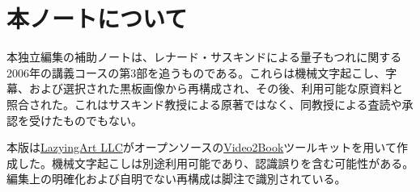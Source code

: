 \documentclass[11pt,oneside]{book}
\begin{document}
\frontmatter
\hypersetup{pageanchor=false}

\hypersetup{pageanchor=true}

\clearpage
\chapter*{本ノートについて}
本独立編集の補助ノートは、レナード・サスキンドによる量子もつれに関する2006年の講義コースの第3部を追うものである。これらは機械文字起こし、字幕、および選択された黒板画像から再構成され、その後、利用可能な原資料と照合された。これはサスキンド教授による原著ではなく、同教授による査読や承認を受けたものでもない。

本版は\href{https://lazying.art}{LazyingArt LLC}がオープンソースの\href{https://github.com/lachlanchen/Video2Book}{Video2Book}ツールキットを用いて作成した。機械文字起こしは別途利用可能であり、認識誤りを含む可能性がある。編集上の明確化および自明でない再構成は脚注で識別されている。
\clearpage
\tableofcontents
\mainmatter








\end{document}
